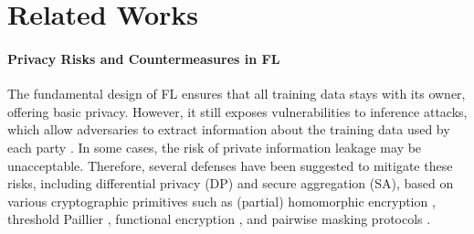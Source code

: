 \section{Related Works}


\paragraph{Privacy Risks and Countermeasures in FL}

The fundamental design of FL ensures that all training data stays with its owner, offering basic privacy. However, it still exposes vulnerabilities to inference attacks, which allow adversaries to extract information about the training data used by each party \cite{nasr2019comprehensive, shokri2017membership,baracaldo2022protecting, nasr2019comprehensive, huang2021evaluating, geiping2020inverting}. In some cases, the risk of private information leakage may be unacceptable. Therefore, several defenses have been suggested to mitigate these risks, including differential privacy (DP) and secure aggregation (SA), based on various cryptographic primitives such as (partial) homomorphic encryption \cite{liu2019secure, zhang2020batchcrypt}, threshold Paillier \cite{truex2019hybrid}, functional encryption \cite{xu2019hybridalpha}, and pairwise masking protocols \cite{bonawitz2017practical}. 




